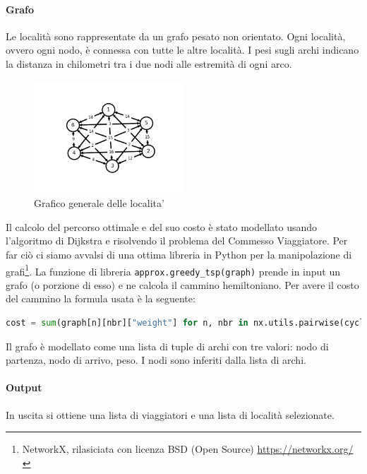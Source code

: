 \documentclass{article}
\begin{document}
\paragraph*{Grafo}
Le località sono rappresentate da un grafo pesato non orientato. Ogni località, ovvero ogni nodo, è connessa con tutte le altre località. I pesi sugli archi indicano la distanza in chilometri tra i due nodi alle estremità di ogni arco.
\begin{figure}[h]
  \centering
  \includegraphics[width=0.50\textwidth]{img/graphTot.png}
  \caption{Grafico generale delle localita'}\label{fig:graphTot.png}
\end{figure}
Il calcolo del percorso ottimale e del suo costo è stato modellato usando l'algoritmo di Dijkstra e risolvendo il problema del Commesso Viaggiatore. Per far ciò ci siamo avvalsi di una ottima libreria in Python per la manipolazione di grafi\footnote{NetworkX, rilasiciata con licenza BSD (Open Source) \url{https://networkx.org/}}. La funzione di libreria \verb|approx.greedy_tsp(graph)| prende in input un grafo (o porzione di esso) e ne calcola il cammino hemiltoniano.
Per avere il costo del cammino la formula usata è la seguente:
\begin{lstlisting}[language=Python]
cost = sum(graph[n][nbr]["weight"] for n, nbr in nx.utils.pairwise(cycle))
\end{lstlisting}
Il grafo è modellato come una lista di tuple di archi con tre valori: nodo di partenza, nodo di arrivo, peso.
I nodi sono inferiti dalla lista di archi.
\paragraph*{Output}
In uscita si ottiene una lista di viaggiatori e una lista di località selezionate.
\end{document}
